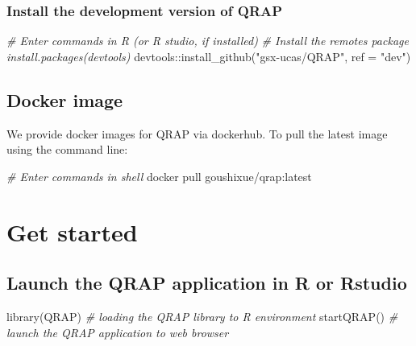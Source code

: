 \documentclass[
  a4paper,
  oneside]{book}
\newenvironment{Shaded}{\begin{snugshade}}{\end{snugshade}}
\newcommand{\AttributeTok}[1]{\textcolor[rgb]{0.77,0.63,0.00}{#1}}
\newcommand{\CommentTok}[1]{\textcolor[rgb]{0.56,0.35,0.01}{\textit{#1}}}
\newcommand{\FunctionTok}[1]{\textcolor[rgb]{0.00,0.00,0.00}{#1}}
\newcommand{\NormalTok}[1]{#1}
\newcommand{\SpecialCharTok}[1]{\textcolor[rgb]{0.00,0.00,0.00}{#1}}
\newcommand{\StringTok}[1]{\textcolor[rgb]{0.31,0.60,0.02}{#1}}
\begin{document}
\hypertarget{install-the-development-version-of-qrap}{%
\subsubsection{Install the development version of QRAP}\label{install-the-development-version-of-qrap}}

\begin{Shaded}
\begin{Highlighting}[]
\CommentTok{\# Enter commands in R (or R studio, if installed) }
\CommentTok{\# Install the remotes package install.packages(\textquotesingle{}devtools\textquotesingle{}) }
\NormalTok{devtools}\SpecialCharTok{::}\FunctionTok{install\_github}\NormalTok{(}\StringTok{"gsx{-}ucas/QRAP"}\NormalTok{, }\AttributeTok{ref =} \StringTok{"dev"}\NormalTok{)}
\end{Highlighting}
\end{Shaded}

\hypertarget{docker-image}{%
\subsection{Docker image}\label{docker-image}}

We provide docker images for QRAP via dockerhub. To pull the latest image using the command line:

\begin{Shaded}
\begin{Highlighting}[]
\CommentTok{\# Enter commands in shell}
\NormalTok{docker pull goushixue}\SpecialCharTok{/}\NormalTok{qrap}\SpecialCharTok{:}\NormalTok{latest}
\end{Highlighting}
\end{Shaded}

\hypertarget{get-started}{%
\section{Get started}\label{get-started}}

\hypertarget{launch-the-qrap-application-in-r-or-rstudio}{%
\subsection{Launch the QRAP application in R or Rstudio}\label{launch-the-qrap-application-in-r-or-rstudio}}

\begin{Shaded}
\begin{Highlighting}[]
\FunctionTok{library}\NormalTok{(QRAP) }\CommentTok{\# loading the QRAP library to R environment}
\FunctionTok{startQRAP}\NormalTok{() }\CommentTok{\# launch the QRAP application to web browser}
\end{Highlighting}
\end{Shaded}
\end{document}
